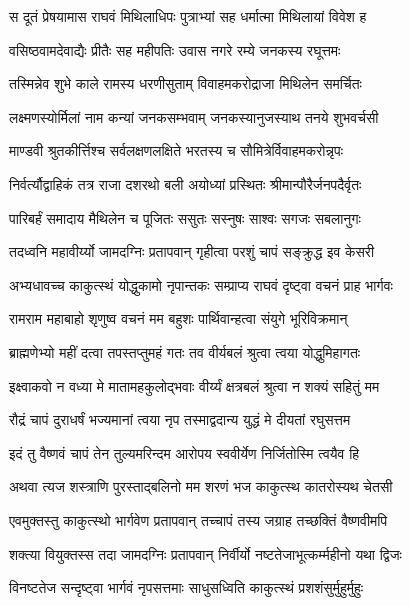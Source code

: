 \twolineshloka
{स दूतं प्रेषयामास राघवं मिथिलाधिपः}
{पुत्राभ्यां सह धर्मात्मा मिथिलायां विवेश ह}%

\twolineshloka
{वसिष्ठवामदेवाद्यैः प्रीतैः सह महीपतिः}
{उवास नगरे रम्ये जनकस्य रघूत्तमः}%

\twolineshloka
{तस्मिन्नेव शुभे काले रामस्य धरणीसुताम्}
{विवाहमकरोद्राजा मिथिलेन समर्चितः}%

\twolineshloka
{लक्ष्मणस्योर्मिलां नाम कन्यां जनकसम्भवाम्}
{जनकस्यानुजस्याथ तनये शुभवर्चसी}%

\twolineshloka
{माण्डवी श्रुतकीर्त्तिश्च सर्वलक्षणलक्षिते}
{भरतस्य च सौमित्रेर्विवाहमकरोन्नृपः}%

\twolineshloka
{निर्वर्त्यौद्वाहिकं तत्र राजा दशरथो बली}
{अयोध्यां प्रस्थितः श्रीमान्पौरैर्जनपदैर्वृतः}%

\twolineshloka
{पारिबर्हं समादाय मैथिलेन च पूजितः}
{ससुतः सस्नुषः साश्वः सगजः सबलानुगः}%

\twolineshloka
{तदध्वनि महावीर्य्यो जामदग्निः प्रतापवान्}
{गृहीत्वा परशुं चापं सङ्क्रुद्ध इव केसरी}%

\twolineshloka
{अभ्यधावच्च काकुत्स्थं योद्धुकामो नृपान्तकः}
{सम्प्राप्य राघवं दृष्ट्वा वचनं प्राह भार्गवः}%


\twolineshloka
{रामराम महाबाहो शृणुष्व वचनं मम}
{बहुशः पार्थिवान्हत्वा संयुगे भूरिविक्रमान्}%

\twolineshloka
{ब्राह्मणेभ्यो महीं दत्वा तपस्तप्तुमहं गतः}
{तव वीर्यबलं श्रुत्वा त्वया योद्धुमिहागतः}%

\twolineshloka
{इक्ष्वाकवो न वध्या मे मातामहकुलोद्भवाः}
{वीर्य्यं क्षत्रबलं श्रुत्वा न शक्यं सहितुं मम}%

\twolineshloka
{रौद्रं चापं दुराधर्षं भज्यमानां त्वया नृप}
{तस्माद्वदान्य युद्धं मे दीयतां रघुसत्तम}%

\twolineshloka
{इदं तु वैष्णवं चापं तेन तुल्यमरिन्दम}
{आरोपय स्ववीर्येण निर्जितोस्मि त्वयैव हि}%

\twolineshloka
{अथवा त्यज शस्त्राणि पुरस्ताद्बलिनो मम}
{शरणं भज काकुत्स्थ कातरोस्यथ चेतसी}%


\twolineshloka
{एवमुक्तस्तु काकुत्स्थो भार्गवेण प्रतापवान्}
{तच्चापं तस्य जग्राह तच्छक्तिं वैष्णवीमपि}%

\twolineshloka
{शक्त्या वियुक्तस्स तदा जामदग्निः प्रतापवान्}
{निर्वीर्यो नष्टतेजाभूत्कर्म्महीनो यथा द्विजः}%

\twolineshloka
{विनष्टतेज सन्दृष्ट्वा भार्गवं नृपसत्तमाः}
{साधुसध्विति काकुत्स्थं प्रशशंसुर्मुहुर्मुहुः}%

